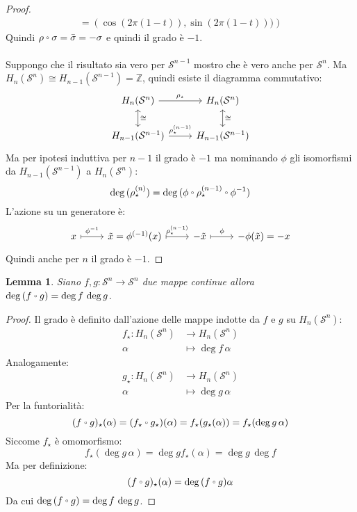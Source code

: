 \documentclass[10pt, toc=sectionentrywithdots]{scrartcl}
\newcounter{lemmac}
\newtheorem{lemma}[lemmac]{Lemma}
\newcommand{\Z}{\mathbb{Z}}
\newcommand{\Sph}[1][]{\mathcal{S}^#1}
\let\latexcirc=\circ
\newcommand{\ccirc}{\mathbin{\mathchoice
  {\xcirc\scriptstyle}
  {\xcirc\scriptstyle}
  {\xcirc\scriptscriptstyle}
  {\xcirc\scriptscriptstyle}
}}
\newcommand{\xcirc}[1]{\vcenter{\hbox{$#1\latexcirc$}}}
\let\circ\ccirc
\begin{document}
\begin{proof}
\begin{gather*}
    = \left(\cos(2 \pi (1-t)), \sin(2 \pi (1-t)))\right)
  \end{gather*}
  Quindi $ \rho \circ \sigma = \bar{\sigma} = - \sigma $ e quindi il grado è
  $ - 1 $.
  \\ \\ \noindent
  Suppongo che il risultato sia vero per $ \Sph{n-1} $
  mostro che è vero anche per $ \Sph{n} $.
  Ma $ H_n(\Sph[n]) \cong H_{n-1}(\Sph{n-1}) = \Z $, quindi esiste il diagramma
  commutativo:
  \[
    \begin{tikzcd}
      H_n(\Sph{n}) \rar{\rho_\star} \arrow[leftrightarrow]{d}{\cong} & H_n(\Sph{n})  \arrow[leftrightarrow]{d}{\cong} \\
      H_{n-1}(\Sph{n-1}) \rar{\rho_\star^{(n-1)}} &  H_{n-1}(\Sph{n-1})
    \end{tikzcd}
  \]
  Ma per ipotesi induttiva per $ n - 1 $ il grado è $ - 1 $ ma nominando
  $ \phi $ gli isomorfismi da $ H_{n-1}(\Sph{n-1}) $ a $ H_n(\Sph{n}) $:
  \[
    \deg{(\rho_\star^{(n)})} = \deg{(\phi \circ \rho_\star^{(n-1)} \circ \phi^{-1})}
  \]
  L'azione su un generatore è:
  \[
    \begin{tikzcd}
      x \rar[mapsto]{\phi^{-1}} & \tilde{x} = \phi^{(-1)}(x) \rar[mapsto]{\rho_\star^{(n-1)}} & - \tilde{x} \rar[mapsto]{\phi} & - \phi(\tilde{x}) = -x
    \end{tikzcd}
  \]
  Quindi anche per $ n $ il grado è $ - 1 $.
\end{proof}
\begin{lemma}
  \label{lemma:composizione_grado}
  Siano $ f,g \colon \Sph{n} \to \Sph{n} $ due mappe continue allora
  $ \deg {(f \circ g)} = \deg{f} \, \deg{g} $.
\end{lemma}
\begin{proof}
  Il grado è definito dall'azione delle mappe indotte da $ f $ e $ g $
  su $ H_n(\Sph{n}) $:
  \begin{align*}
    f_\star \colon H_n(\Sph{n}) & \to H_n(\Sph{n}) \\
    \alpha & \mapsto \deg f \, \alpha
  \end{align*}
  Analogamente:
  \begin{align*}
    g_\star \colon H_n(\Sph{n}) & \to H_n(\Sph{n}) \\
    \alpha & \mapsto \deg g \, \alpha
  \end{align*}
  Per la funtorialità:
  \[
    (f \circ g)_\star (\alpha) = (f_\star \circ g_\star)(\alpha) = f_\star(g_\star(\alpha)) = f_\star (\deg g \, \alpha)
  \]
  Siccome $ f_\star $ è omomorfismo:
  \[
    f_\star (\deg g \, \alpha) = \deg g f_\star (\alpha) = \deg g \, \deg f
  \]
  Ma per definizione:
  \[
    (f \circ g)_\star (\alpha) = \deg{(f \circ g)} \alpha
  \]
  Da cui $ \deg{(f \circ g)} = \deg f \, \deg g $.
\end{proof}
\end{document}
